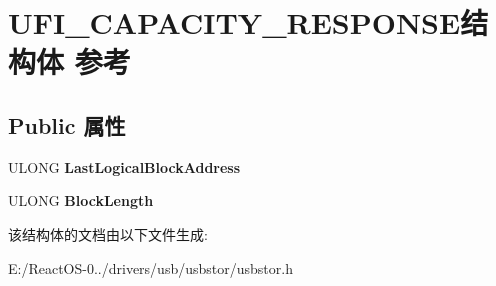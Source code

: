 \hypertarget{struct_u_f_i___c_a_p_a_c_i_t_y___r_e_s_p_o_n_s_e}{}\section{U\+F\+I\+\_\+\+C\+A\+P\+A\+C\+I\+T\+Y\+\_\+\+R\+E\+S\+P\+O\+N\+S\+E结构体 参考}
\label{struct_u_f_i___c_a_p_a_c_i_t_y___r_e_s_p_o_n_s_e}
\subsection*{Public 属性}
\begin{DoxyCompactItemize}
\item 
\mbox{\label{struct_u_f_i___c_a_p_a_c_i_t_y___r_e_s_p_o_n_s_e_acc088eaa20c720a5e77910f039a5bd79}} 
U\+L\+O\+NG {\bfseries Last\+Logical\+Block\+Address}
\item 
\mbox{\label{struct_u_f_i___c_a_p_a_c_i_t_y___r_e_s_p_o_n_s_e_a2a6a95892fd4f7bc2bdb1a9dd5dd3f1f}} 
U\+L\+O\+NG {\bfseries Block\+Length}
\end{DoxyCompactItemize}


该结构体的文档由以下文件生成\+:\begin{DoxyCompactItemize}
\item 
E\+:/\+React\+O\+S-\/0../drivers/usb/usbstor/usbstor.\+h\end{DoxyCompactItemize}
